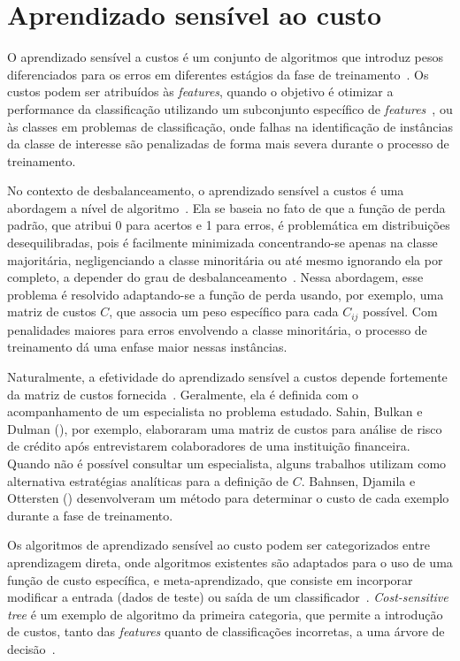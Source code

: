 \section{Aprendizado sensível ao custo}

O aprendizado sensível a custos é um conjunto de algoritmos que introduz pesos diferenciados para os erros em diferentes estágios da fase de treinamento~\cite{FernndezCs2018}. Os custos podem ser atribuídos às \textit{features}, quando o objetivo é otimizar a performance da classificação utilizando um subconjunto específico de \textit{features}~\cite{Zhou2016}, ou às classes em problemas de classificação, onde falhas na identificação de instâncias da classe de interesse são penalizadas de forma mais severa durante o processo de treinamento.

No contexto de desbalanceamento, o aprendizado sensível a custos é uma abordagem a nível de algoritmo~\cite{Krawczyk2016}. Ela se baseia no fato de que a função de perda padrão, que atribui 0 para acertos e 1 para erros, é problemática em distribuições desequilibradas, pois é facilmente minimizada concentrando-se apenas na classe majoritária, negligenciando a classe minoritária ou até mesmo ignorando ela por completo, a depender do grau de desbalanceamento~\cite{Landgrebe2004}. Nessa abordagem, esse problema é resolvido adaptando-se a função de perda usando, por exemplo, uma matriz de custos \(C\), que associa um peso específico para cada \(C_{ij}\) possível. Com penalidades maiores para erros envolvendo a classe minoritária, o processo de treinamento dá uma enfase maior nessas instâncias.

Naturalmente, a efetividade do aprendizado sensível a custos depende fortemente da matriz de custos fornecida~\cite{FernndezCs2018}. Geralmente, ela é definida com o acompanhamento de um especialista no problema estudado. Sahin, Bulkan e Dulman (\citeyear{Sahin2013}), por exemplo, elaboraram uma matriz de custos para análise de risco de crédito após entrevistarem colaboradores de uma instituição financeira. Quando não é possível consultar um especialista, alguns trabalhos utilizam como alternativa estratégias analíticas para a definição de \(C\). Bahnsen, Djamila e Ottersten (\citeyear{Bahnsen2015}) desenvolveram um método para determinar o custo de cada exemplo durante a fase de treinamento.

Os algoritmos de aprendizado sensível ao custo podem ser categorizados entre aprendizagem direta, onde algoritmos existentes são adaptados para o uso de uma função de custo específica, e meta-aprendizado, que consiste em incorporar modificar a entrada (dados de teste) ou saída de um classificador~\cite{FernndezCs2018}. \textit{Cost-sensitive tree} é um exemplo de algoritmo da primeira categoria, que permite a introdução de custos, tanto das \textit{features} quanto de classificações incorretas, a uma árvore de decisão~\cite{Ling2006}.

